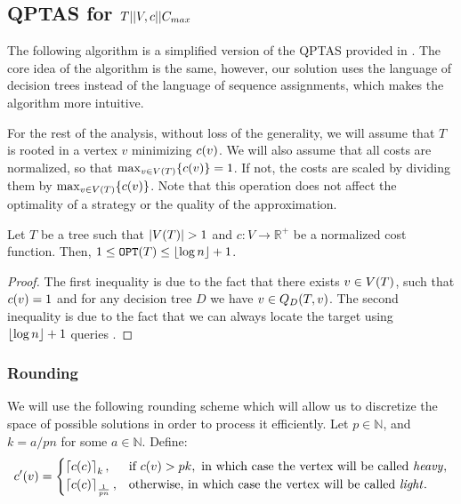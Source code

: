 
\subsection{QPTAS for $T||V,c||C_{max}$}\label{qptasSection}

The following algorithm is a simplified version of the QPTAS provided in \cite{dereniowski2017ApproxSsForGeneralBSinWTs}. The core idea of the algorithm is the same, however, our solution uses the language of decision trees instead of the language of sequence assignments, which makes the algorithm more intuitive.

For the rest of the analysis, without loss of the generality, we will assume that $T$ is rooted in a vertex $v$ minimizing $c\mathopen{}\left( v \right)$.  We will also assume that all costs are normalized, so that $\max_{v\in V\mathopen{}\left( T \right)}\mathopen{}\left\{ c\mathopen{}\left( v \right) \right\}=1$. If not, the costs are scaled by dividing them by $\max_{v\in V\mathopen{}\left( T \right)}\mathopen{}\left\{ c(v) \right\}$. Note that this operation does not affect the optimality of a strategy or the quality of the approximation.
\begin{observation}\label{basicBoundsOnCost}
    Let $T$ be a tree such that $\spr{V\br{T}}> 1$ and $c:V\to \mathbb{R}^+$ be a normalized cost function. Then, $1\leq \texttt{OPT}(T) \leq \mathopen{}\left\lfloor \log n \right\rfloor+1$.
    \begin{proof}
        The first inequality is due to the fact that there exists $v\in V\mathopen{}\left( T \right)$, such that $c\mathopen{}\left( v \right)=1$ and for any decision tree $D$ we have $v\in Q_{D}\mathopen{}\left( T,v \right)$. The second inequality is due to the fact that we can always locate the target using $\mathopen{}\left\lfloor \log n \right\rfloor+1$ queries \cite{OnakParys2006GenOfBSSInTsAndFLikePosets}.
    \end{proof}
\end{observation}
\subsubsection{Rounding}
We will use the following rounding scheme which will allow us to discretize the space of possible solutions in order to process it efficiently. Let $p \in\mathbb{N}$, and $k=a/pn$ for some $a\in\mathbb{N}$. Define:
$$
c'\mathopen{}\left( v \right)=\begin{cases}
    \mathopen{}\left\lceil c\mathopen{}\left( c \right) \right\rceil_k, & \text{if } c\mathopen{}\left( v \right)>pk, \text{ in which case the vertex will be called \textit{heavy}},\\
    \mathopen{}\left\lceil c\mathopen{}\left( c \right) \right\rceil_{\frac{1}{pn}}, & \text{otherwise, in which case the vertex will be called \textit{light}}.\\
\end{cases}
$$

